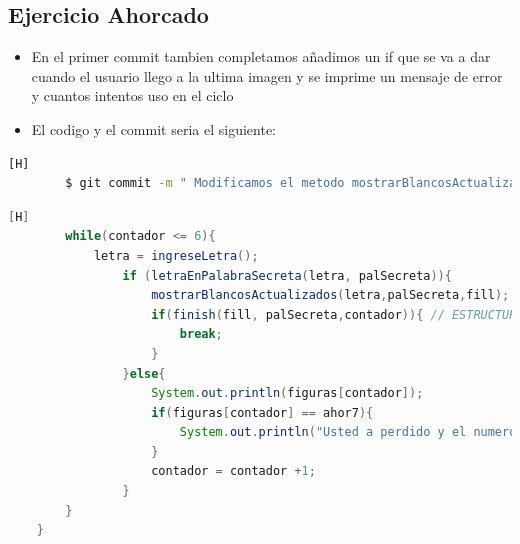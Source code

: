 \documentclass{article}
\begin{document}
	\subsection{Ejercicio Ahorcado}
	\begin{itemize}	
		\item En el primer commit tambien completamos añadimos un if que se va a dar cuando el usuario llego a la ultima imagen y se imprime un mensaje de error y cuantos intentos uso en el ciclo
		\item El codigo y el commit seria el siguiente:
	\end{itemize}
	\begin{lstlisting}[language=bash,caption={Commit}][H]
		$ git commit -m " Modificamos el metodo mostrarBlancosActualizados y completamos el metodo letraEnPalabraSecreta y agregamos un Mensaje de perdio y cuantos intentos uso"
	\end{lstlisting}
	\begin{lstlisting}[language=java,caption={Las lineas de codigo de lo añadido:}][H]
        while(contador <= 6){
            letra = ingreseLetra();
                if (letraEnPalabraSecreta(letra, palSecreta)){
                    mostrarBlancosActualizados(letra,palSecreta,fill);
                    if(finish(fill, palSecreta,contador)){ // ESTRUCTURA DE CONTROL USADA  Y TAMBIEN EL METODO CREADO QUE ES FINISH
                        break;
                    }
                }else{
                    System.out.println(figuras[contador]);
                    if(figuras[contador] == ahor7){
                        System.out.println("Usted a perdido y el numero de intentos es : " + contador); // MENSAJE DE PERDIO Y CUANTOS INTENTOS USO 
                    }
                    contador = contador +1;
                }
        }
    }
	\end{lstlisting}
\end{document}
